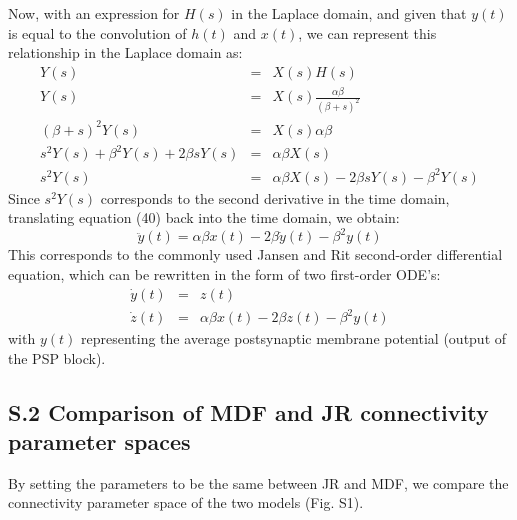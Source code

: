 \documentclass[12pt,twoside]{article}
\begin{document}
Now, with an expression for $H(s)$ in the Laplace domain, and given that $y(t)$ is equal to the convolution of $h(t)$ and $x(t)$, we can represent this relationship in the Laplace domain as:
\begin{eqnarray}
    Y(s) &=& X(s)H(s)\\
    Y(s) &=& X(s)\frac{\alpha \beta}{(\beta + s)^{2}}\\
    (\beta +s)^{2}Y(s) &=& X(s)\alpha \beta\\
    s^{2}Y(s) + \beta^{2}Y(s) + 2\beta s Y(s) &=& \alpha \beta X(s)\\
    s^{2}Y(s) &=& \alpha \beta X(s) - 2\beta s Y(s) - \beta^{2}Y(s)
\end{eqnarray}
Since $s^{2}Y(s)$ corresponds to the second derivative in the time domain, translating equation (40) back into the time domain, we obtain:
\begin{equation}
    \ddot{y}(t) = \alpha \beta x(t) - 2\beta \dot{y}(t) - \beta^{2}y(t)
\end{equation}
This corresponds to the commonly used Jansen and Rit second-order differential equation, which can be rewritten in the form of two first-order ODE's:
\begin{eqnarray}
    \dot{y}(t) &=& z(t)\\
    \dot{z}(t) &=& \alpha \beta x(t) -2\beta z(t) - \beta^{2}y(t)
\end{eqnarray}
with $y(t)$ representing the average postsynaptic membrane potential (output of the PSP block). 

\newpage
\subsection*{S.2 Comparison of MDF and JR connectivity parameter spaces }

By setting the parameters to be the same between JR and MDF, we compare the connectivity parameter space of the two models (Fig. S1).



\end{document}
